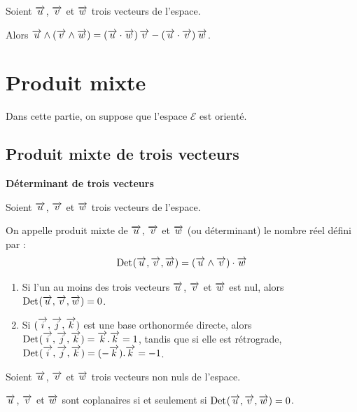 \documentclass[10pt,oneside]{article}
\newcommand{\Det}{\mathrm{Det}\hspace{.2mm}}
\begin{document}
\begin{propo}

Soient $\overrightarrow{u}$, $\overrightarrow{v}$ et $\overrightarrow{w}$ trois vecteurs de l'espace.

Alors $\overrightarrow{u} \wedge\left(\overrightarrow{v}\wedge \overrightarrow{w}\right)=\left(\overrightarrow{u} \cdot \overrightarrow{w} \right)\overrightarrow{v}-\left(\overrightarrow{u}\cdot \overrightarrow{v}\right) \overrightarrow{w}$.\\
\end{propo}


\section{Produit mixte}

Dans cette partie, on suppose que l'espace $\mathcal{E}$ est orienté.

\subsection{Produit mixte de trois vecteurs}

\begin{defi}
\textbf{Déterminant de trois vecteurs}

Soient $\overrightarrow{u}$, $\overrightarrow{v}$ et $\overrightarrow{w}$ trois vecteurs de l'espace.

On appelle produit mixte de $\overrightarrow{u}$, $\overrightarrow{v}$ et $\overrightarrow{w}$ (ou déterminant) le nombre réel défini par :
$$\Det(\vect{u}, \vect{v}, \vect{w})=\left(\vect{u}\wedge\vect{v}\right)\cdot\vect {w}$$
\end{defi}


\begin{rem}

\begin{enumerate}
\item Si l'un au moins des trois vecteurs $\overrightarrow{u}$, $\overrightarrow{v}$ et $\overrightarrow{w}$ est nul, alors $\Det(\vect{u}, \vect{v}, \vect{w})=0$.
\item Si $(\overrightarrow{i}, \overrightarrow{j}, \overrightarrow{k})$ est une base orthonormée directe, alors $\Det(\vect{i}, \vect{j}, \vect{k})=\vect{k}.\vect{k}=1$, tandis que si elle est rétrograde, $\Det(\vect{i}, \vect{j}, \vect{k})=(-\vect{k}).\vect{k}=-1$.\\
\end{enumerate}

\end{rem}
\begin{propo}

Soient $\overrightarrow{u}$, $\overrightarrow{v}$ et $\overrightarrow{w}$ trois vecteurs non nuls de l'espace.

$\overrightarrow{u}$, $\overrightarrow{v}$ et $\overrightarrow{w}$ sont coplanaires si et seulement si $\Det(\vect{u}, \vect{v}, \vect{w})=0$.
\end{propo}
\end{document}
